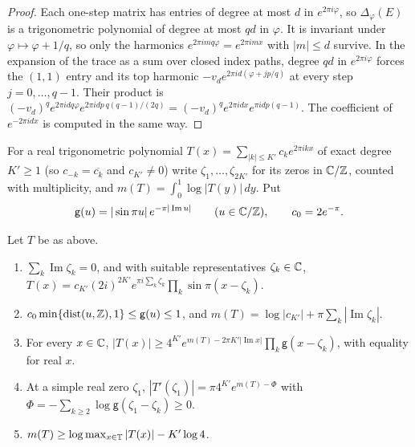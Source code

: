 \begin{proof}
Each one-step matrix has entries of degree at most $d$ in $e^{2\pi i\varphi}$, so $\Delta_\varphi(E)$ is a trigonometric polynomial of degree at most $qd$ in $\varphi$. It is invariant under $\varphi\mapsto\varphi+1/q$, so only the harmonics $e^{2\pi imq\varphi}=e^{2\pi imx}$ with $|m|\le d$ survive. In the expansion of the trace as a sum over closed index paths, degree $qd$ in $e^{2\pi i\varphi}$ forces the $(1,1)$ entry and its top harmonic $-v_de^{2\pi id(\varphi+jp/q)}$ at every step $j=0,\dots,q-1$. Their product is $(-v_d)^qe^{2\pi idq\varphi}e^{2\pi idp\,q(q-1)/(2q)}=(-v_d)^qe^{2\pi idx}e^{\pi idp(q-1)}$. The coefficient of $e^{-2\pi idx}$ is computed in the same way.
\end{proof}

For a real trigonometric polynomial $T(x)=\sum_{|k|\le K'}c_ke^{2\pi ikx}$ of exact degree $K'\ge1$ (so $c_{-k}=\overline{c_k}$ and $c_{K'}\ne0$) write $\zeta_1,\dots,\zeta_{2K'}$ for its zeros in $\mathbb C/\mathbb Z$, counted with multiplicity, and $m(T)=\int_0^1\log|T(y)|\,dy$. Put
\[
\mathsf g(u)=|\sin\pi u|\,e^{-\pi|\operatorname{Im}u|}\qquad(u\in\mathbb C/\mathbb Z),\qquad c_0=2e^{-\pi}.
\]

\begin{lemma}[Factorization]\label{lem:EF}
Let $T$ be as above.
\begin{enumerate}
\item $\sum_k\operatorname{Im}\zeta_k=0$, and with suitable representatives $\zeta_k\in\mathbb C$, $T(x)=c_{K'}(2i)^{2K'}e^{\pi i\sum_k\zeta_k}\prod_k\sin\pi(x-\zeta_k)$.
\item $c_0\min\{\operatorname{dist}(u,\mathbb Z),1\}\le\mathsf g(u)\le1$, and $m(T)=\log|c_{K'}|+\pi\sum_k|\operatorname{Im}\zeta_k|$.
\item For every $x\in\mathbb C$, $|T(x)|\ge4^{K'}e^{m(T)-2\pi K'|\operatorname{Im}x|}\prod_k\mathsf g(x-\zeta_k)$, with equality for real $x$.
\item At a simple real zero $\zeta_1$, $|T'(\zeta_1)|=\pi4^{K'}e^{m(T)-\Phi}$ with $\Phi=-\sum_{k\ge2}\log\mathsf g(\zeta_1-\zeta_k)\ge0$.
\item $m(T)\ge\log\max_{x\in\mathbb T}|T(x)|-K'\log4$.
\end{enumerate}
\end{lemma}

